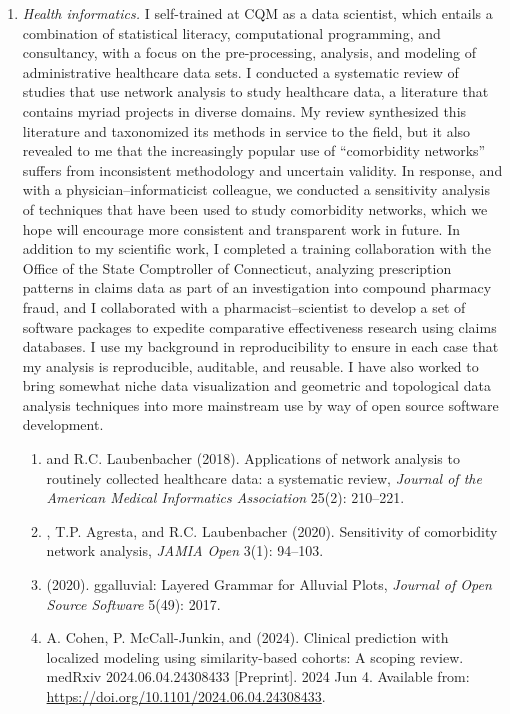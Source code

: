 \documentclass{nihbiosketch}
\begin{document}
\begin{enumerate}
\item \emph{Health informatics.}
I self-trained at CQM as a data scientist, which entails a combination of statistical literacy, computational programming, and consultancy, with a focus on the pre-processing, analysis, and modeling of administrative healthcare data sets.
I conducted a systematic review of studies that use network analysis to study healthcare data, a literature that contains myriad projects in diverse domains. My review synthesized this literature and taxonomized its methods in service to the field, but it also revealed to me that the increasingly popular use of ``comorbidity networks'' suffers from inconsistent methodology and uncertain validity. In response, and with a physician--informaticist colleague, we conducted a sensitivity analysis of techniques that have been used to study comorbidity networks, which we hope will encourage more consistent and transparent work in future.
In addition to my scientific work, I completed a training collaboration with the Office of the State Comptroller of Connecticut, analyzing prescription patterns in claims data as part of an investigation into compound pharmacy fraud, and I collaborated with a pharmacist--scientist to develop a set of software packages to expedite comparative effectiveness research using claims databases.
I use my background in reproducibility to ensure in each case that my analysis is reproducible, auditable, and reusable. I have also worked to bring somewhat niche data visualization and geometric and topological data analysis techniques into more mainstream use by way of open source software development.

\begin{enumerate}
\item {} and R.C. Laubenbacher (2018). Applications of network analysis to routinely collected healthcare data: a systematic review, \emph{Journal of the American Medical Informatics Association} 25(2): 210--221.
\item {}, T.P. Agresta, and R.C. Laubenbacher (2020). Sensitivity of comorbidity network analysis, \emph{JAMIA Open} 3(1): 94--103.
\item {} (2020). ggalluvial: Layered Grammar for Alluvial Plots, \emph{Journal of Open Source Software} 5(49): 2017.
\item A. Cohen, P. McCall-Junkin, and  (2024). Clinical prediction with localized modeling using similarity-based cohorts: A scoping review. medRxiv 2024.06.04.24308433 [Preprint]. 2024 Jun 4.  Available from: \url{https://doi.org/10.1101/2024.06.04.24308433}.
\end{enumerate}


\end{enumerate}
\end{document}
